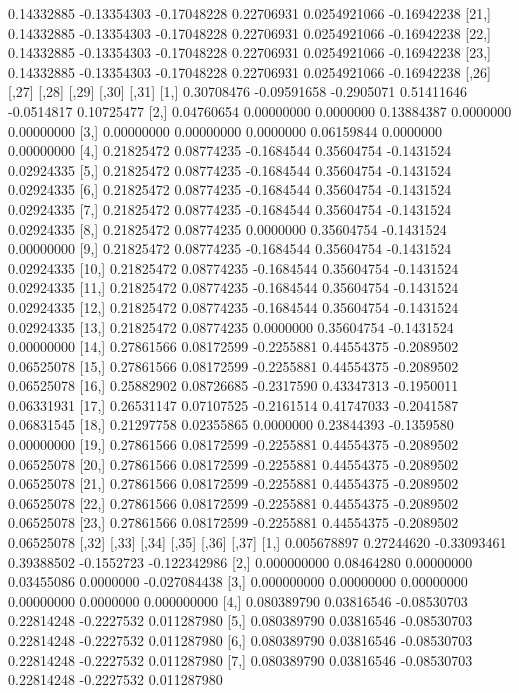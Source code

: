 \documentclass[a4paper]{article}
\begin{document}
\begin{Schunk}
\begin{Soutput}
[20,] 0.14332885 -0.13354303 -0.17048228  0.22706931 0.0254921066 -0.16942238
[21,] 0.14332885 -0.13354303 -0.17048228  0.22706931 0.0254921066 -0.16942238
[22,] 0.14332885 -0.13354303 -0.17048228  0.22706931 0.0254921066 -0.16942238
[23,] 0.14332885 -0.13354303 -0.17048228  0.22706931 0.0254921066 -0.16942238
           [,26]       [,27]      [,28]      [,29]      [,30]      [,31]
 [1,] 0.30708476 -0.09591658 -0.2905071 0.51411646 -0.0514817 0.10725477
 [2,] 0.04760654  0.00000000  0.0000000 0.13884387  0.0000000 0.00000000
 [3,] 0.00000000  0.00000000  0.0000000 0.06159844  0.0000000 0.00000000
 [4,] 0.21825472  0.08774235 -0.1684544 0.35604754 -0.1431524 0.02924335
 [5,] 0.21825472  0.08774235 -0.1684544 0.35604754 -0.1431524 0.02924335
 [6,] 0.21825472  0.08774235 -0.1684544 0.35604754 -0.1431524 0.02924335
 [7,] 0.21825472  0.08774235 -0.1684544 0.35604754 -0.1431524 0.02924335
 [8,] 0.21825472  0.08774235  0.0000000 0.35604754 -0.1431524 0.00000000
 [9,] 0.21825472  0.08774235 -0.1684544 0.35604754 -0.1431524 0.02924335
[10,] 0.21825472  0.08774235 -0.1684544 0.35604754 -0.1431524 0.02924335
[11,] 0.21825472  0.08774235 -0.1684544 0.35604754 -0.1431524 0.02924335
[12,] 0.21825472  0.08774235 -0.1684544 0.35604754 -0.1431524 0.02924335
[13,] 0.21825472  0.08774235  0.0000000 0.35604754 -0.1431524 0.00000000
[14,] 0.27861566  0.08172599 -0.2255881 0.44554375 -0.2089502 0.06525078
[15,] 0.27861566  0.08172599 -0.2255881 0.44554375 -0.2089502 0.06525078
[16,] 0.25882902  0.08726685 -0.2317590 0.43347313 -0.1950011 0.06331931
[17,] 0.26531147  0.07107525 -0.2161514 0.41747033 -0.2041587 0.06831545
[18,] 0.21297758  0.02355865  0.0000000 0.23844393 -0.1359580 0.00000000
[19,] 0.27861566  0.08172599 -0.2255881 0.44554375 -0.2089502 0.06525078
[20,] 0.27861566  0.08172599 -0.2255881 0.44554375 -0.2089502 0.06525078
[21,] 0.27861566  0.08172599 -0.2255881 0.44554375 -0.2089502 0.06525078
[22,] 0.27861566  0.08172599 -0.2255881 0.44554375 -0.2089502 0.06525078
[23,] 0.27861566  0.08172599 -0.2255881 0.44554375 -0.2089502 0.06525078
            [,32]      [,33]       [,34]      [,35]      [,36]        [,37]
 [1,] 0.005678897 0.27244620 -0.33093461 0.39388502 -0.1552723 -0.122342986
 [2,] 0.000000000 0.08464280  0.00000000 0.03455086  0.0000000 -0.027084438
 [3,] 0.000000000 0.00000000  0.00000000 0.00000000  0.0000000  0.000000000
 [4,] 0.080389790 0.03816546 -0.08530703 0.22814248 -0.2227532  0.011287980
 [5,] 0.080389790 0.03816546 -0.08530703 0.22814248 -0.2227532  0.011287980
 [6,] 0.080389790 0.03816546 -0.08530703 0.22814248 -0.2227532  0.011287980
 [7,] 0.080389790 0.03816546 -0.08530703 0.22814248 -0.2227532  0.011287980

\end{Soutput}
\end{Schunk}
\end{document}
